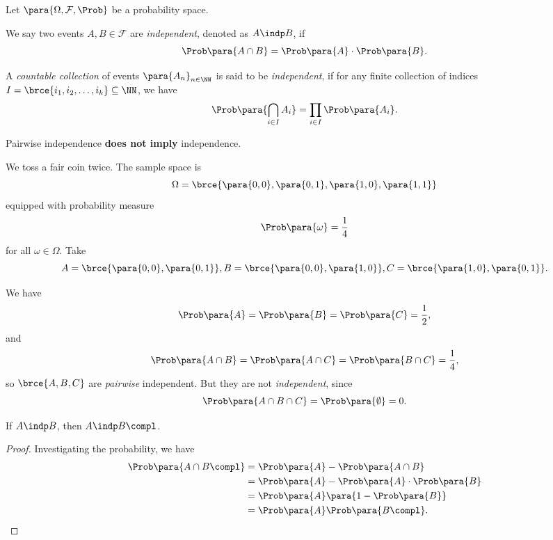Let \(\para{\Omega, \mathcal{F}, \Prob}\) be a probability space.

\begin{definition}[Independence]
    \label{def:independence}%
    We say two events \(A, B \in \mathcal{F}\) are \emph{independent}, denoted as \(A \indp B\), if
    \[
        \Prob\para{A \cap B} = \Prob\para{A} \cdot \Prob\para{B}.
    \]

    A \emph{countable collection} of events \(\para{A_n}_{n \in \NN}\) is said to be \emph{independent}, if for any finite collection of indices \(I = \brce{i_1, i_2, \ldots, i_k} \subseteq \NN\), we have
    \[
        \Prob\para{\bigcap_{i \in I} A_i} = \prod_{i \in I} \Prob\para{A_i}.
    \]
\end{definition}

\begin{remark}
    Pairwise independence \textbf{does not imply} independence.
\end{remark}

\begin{example}
    \label{ex:pairwise-indep-does-not-imply-indep}
    We toss a fair coin twice. The sample space is
    \[
        \Omega = \brce{\para{0, 0}, \para{0, 1}, \para{1, 0}, \para{1, 1}}
    \]
    equipped with probability measure
    \[
        \Prob\para{\omega} = \frac{1}{4}
    \]  
    for all \(\omega \in \Omega\). Take
    \[
        A = \brce{\para{0, 0}, \para{0, 1}}, B = \brce{\para{0, 0}, \para{1, 0}}, C = \brce{\para{1, 0}, \para{0, 1}}.
    \]

    We have
    \[
        \Prob\para{A} = \Prob\para{B} = \Prob\para{C} = \frac{1}{2},
    \]
    and
    \[
        \Prob\para{A \cap B} = \Prob\para{A \cap C} = \Prob\para{B \cap C} = \frac{1}{4},
    \]
    so \(\brce{A, B, C}\) are \emph{pairwise} independent. But they are not \emph{independent}, since
    \[
        \Prob\para{A \cap B \cap C} = \Prob\para{\emptyset} = 0.
    \]
\end{example}

\begin{proposition}
    \label{prop:indep-compl}%
    If \(A \indp B\), then \(A \indp B\compl\).
\end{proposition}

\begin{proof}
    Investigating the probability, we have
    \begin{align*}
        \Prob\para{A \cap B\compl} &= \Prob\para{A} - \Prob\para{A \cap B} \\
        &= \Prob\para{A} - \Prob\para{A} \cdot \Prob\para{B} \\
        &= \Prob\para{A} \para{1 - \Prob\para{B}} \\
        &= \Prob\para{A} \Prob\para{B\compl}.
    \end{align*}
\end{proof}

